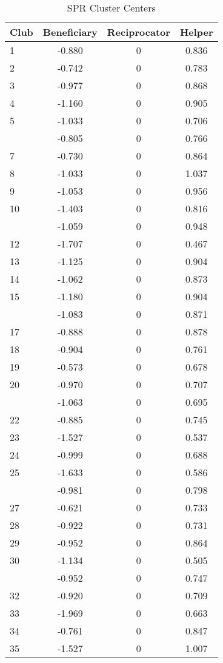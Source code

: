 \documentclass[
]{article}
\begin{document}
\begin{table}

\caption{\label{tab:cluster centers}SPR Cluster Centers}
\centering
\begin{tabular}[t]{lccc}
\toprule
Club & Beneficiary & Reciprocator & Helper\\
\midrule
1 & -0.880 & 0 & 0.836\\
2 & -0.742 & 0 & 0.783\\
3 & -0.977 & 0 & 0.868\\
4 & -1.160 & 0 & 0.905\\
5 & -1.033 & 0 & 0.706\\
\addlinespace
6 & -0.805 & 0 & 0.766\\
7 & -0.730 & 0 & 0.864\\
8 & -1.033 & 0 & 1.037\\
9 & -1.053 & 0 & 0.956\\
10 & -1.403 & 0 & 0.816\\
\addlinespace
11 & -1.059 & 0 & 0.948\\
12 & -1.707 & 0 & 0.467\\
13 & -1.125 & 0 & 0.904\\
14 & -1.062 & 0 & 0.873\\
15 & -1.180 & 0 & 0.904\\
\addlinespace
16 & -1.083 & 0 & 0.871\\
17 & -0.888 & 0 & 0.878\\
18 & -0.904 & 0 & 0.761\\
19 & -0.573 & 0 & 0.678\\
20 & -0.970 & 0 & 0.707\\
\addlinespace
21 & -1.063 & 0 & 0.695\\
22 & -0.885 & 0 & 0.745\\
23 & -1.527 & 0 & 0.537\\
24 & -0.999 & 0 & 0.688\\
25 & -1.633 & 0 & 0.586\\
\addlinespace
26 & -0.981 & 0 & 0.798\\
27 & -0.621 & 0 & 0.733\\
28 & -0.922 & 0 & 0.731\\
29 & -0.952 & 0 & 0.864\\
30 & -1.134 & 0 & 0.505\\
\addlinespace
31 & -0.952 & 0 & 0.747\\
32 & -0.920 & 0 & 0.709\\
33 & -1.969 & 0 & 0.663\\
34 & -0.761 & 0 & 0.847\\
35 & -1.527 & 0 & 1.007\\
\bottomrule
\end{tabular}
\end{table}
\end{document}
